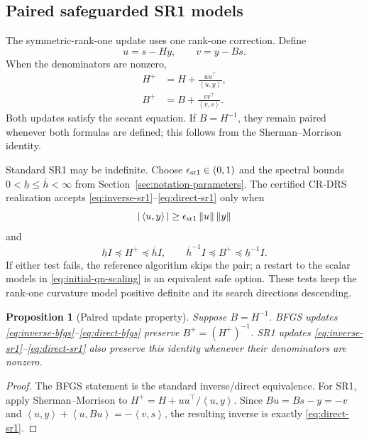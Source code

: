\documentclass[10pt,leqno]{amsart}
\numberwithin{equation}{section}
\numberwithin{algorithm}{section}
\newtheorem{proposition}[theorem]{Proposition}
\theoremstyle{remark}
\newcommand{\norm}[1]{\left\lVert #1 \right\rVert}
\newcommand{\ip}[2]{\left\langle #1,#2 \right\rangle}
\begin{document}
\subsection{Paired safeguarded SR1 models}
\label{sec:sr1-model}

The symmetric-rank-one update uses one rank-one correction.  Define
\begin{equation}
\label{eq:sr1-u-v}
    u=s-Hy,
    \qquad
    v=y-Bs.
\end{equation}
When the denominators are nonzero,
\begin{align}
    H^+&=H+\frac{uu^\top}{\ip{u}{y}},
    \label{eq:inverse-sr1}\\
    B^+&=B+\frac{vv^\top}{\ip{v}{s}}.
    \label{eq:direct-sr1}
\end{align}
Both updates satisfy the secant equation.  If $B=H^{-1}$, they remain paired whenever both formulas are defined; this follows from the Sherman--Morrison identity.

Standard SR1 may be indefinite.  Choose $\epsilon_{\rm sr1}\in(0,1)$ and the spectral bounds $0<\underline h\le\overline h<\infty$ from Section~\ref{sec:notation-parameters}.  The certified CR-DRS realization accepts \eqref{eq:inverse-sr1}--\eqref{eq:direct-sr1} only when
\begin{equation}
\label{eq:sr1-skip}
    |\ip{u}{y}|\ge\epsilon_{\rm sr1}\norm{u}\norm{y}
\end{equation}
and
\begin{equation}
\label{eq:sr1-spectral-bounds}
   \underline h I\preceq H^+\preceq\overline h I,
   \qquad
   \overline h^{-1}I\preceq B^+\preceq\underline h^{-1}I.
\end{equation}
If either test fails, the reference algorithm skips the pair; a restart to the scalar models in \eqref{eq:initial-qn-scaling} is an equivalent safe option.  These tests keep the rank-one curvature model positive definite and its search directions descending.

\begin{proposition}[Paired update property]
\label{prop:paired-update-property}
Suppose $B=H^{-1}$.  BFGS updates \eqref{eq:inverse-bfgs}--\eqref{eq:direct-bfgs} preserve $B^+=(H^+)^{-1}$.  SR1 updates \eqref{eq:inverse-sr1}--\eqref{eq:direct-sr1} also preserve this identity whenever their denominators are nonzero.
\end{proposition}

\begin{proof}
The BFGS statement is the standard inverse/direct equivalence.  For SR1, apply Sherman--Morrison to $H^+=H+uu^\top/\ip{u}{y}$.  Since $Bu=Bs-y=-v$ and
$\ip{u}{y}+\ip{u}{Bu}=-\ip{v}{s}$, the resulting inverse is exactly \eqref{eq:direct-sr1}.
\end{proof}
\end{document}
